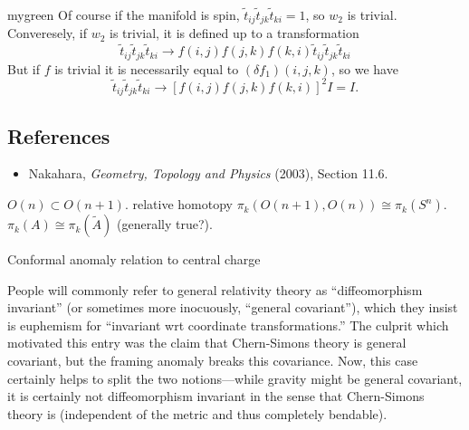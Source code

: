 \documentclass{report}
\begin{document}
\begin{barbox}{mygreen}
Of course if the manifold is spin, $\tilde{t}_{ij}\tilde{t}_{jk}\tilde{t}_{ki}=1$, 
so $ w_2 $ is trivial. Converesely, if $ w_2 $ is trivial, it is defined up 
to a transformation 
\begin{equation*}
	\tilde{t}_{ij}\tilde{t}_{jk}\tilde{t}_{ki}
	\to 
	f(i,j) f(j,k) f(k,i) \tilde{t}_{ij}\tilde{t}_{jk}\tilde{t}_{ki}
\end{equation*}
But if $ f $ is trivial it is necessarily equal to $ (\delta f_1)(i,j, k) $, so we have 
\begin{equation*}
	\tilde{t}_{ij}\tilde{t}_{jk}\tilde{t}_{ki}
	\to 
	[f(i,j) f(j,k) f(k,i)]^2 I = I.
\end{equation*}
\end{barbox}

\subsection*{References}  
\begin{itemize}[itemsep=0.2ex]
\item Nakahara, \textit{Geometry, Topology and Physics} (2003), Section 11.6. 
\end{itemize}


$ O(n) \subset O(n+1) $. relative homotopy $ \pi_k(O(n+1), O(n)) \cong \pi_k(S^n)$.
$ \pi_k(A) \cong \pi_k(\tilde{A})  $ (generally true?).

Conformal anomaly relation to central charge

\label{sec:diffeo-kerfuffle}
People will commonly refer to general relativity theory as ``diffeomorphism 
invariant'' (or sometimes more inocuously, ``general covariant''), 
which they insist is euphemism for ``invariant wrt coordinate transformations.''
The culprit which motivated this entry was the claim that Chern-Simons theory is 
general covariant, but the framing anomaly breaks this covariance. Now, this 
case certainly helps to split the two notions---while gravity might be general 
covariant, it is certainly not diffeomorphism invariant in the sense that 
Chern-Simons theory is (independent of the metric and thus completely bendable). 
\end{document}
